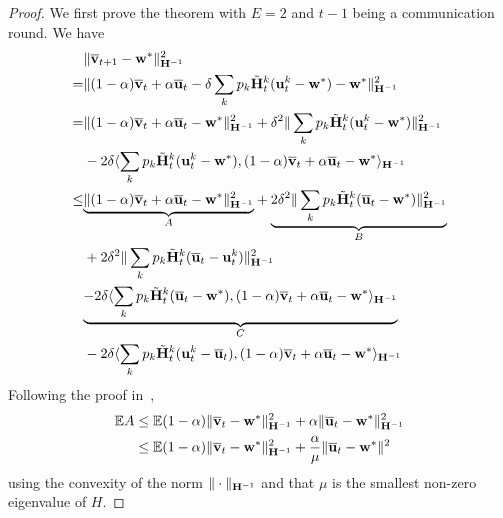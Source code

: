 \begin{proof}
	We first prove the theorem with $E=2$ and $t-1$ being a communication
	round. We have 
	{\small
	\begin{align*}
	& \|\overline{\mathbf{v}}_{t+1}-\mathbf{w}^{\ast}\|_{{\mathbf{H}}^{-1}}^{2}\\
	=&\|(1-\alpha){\overline{\mathbf{v}}}_{t}+\alpha{\overline{\mathbf{u}}}_{t}-\delta\sum_{k}p_{k}\tilde{{\mathbf{H}}}_{t}^{k}({\mathbf{u}}_{t}^{k}-{\mathbf{w}}^{\ast})-{\mathbf{w}}^{\ast}\|_{{\mathbf{H}}^{-1}}^{2}\\
	=&\|(1-\alpha){\overline{\mathbf{v}}}_{t}+\alpha{\overline{\mathbf{u}}}_{t}-{\mathbf{w}}^{\ast}\|_{{\mathbf{H}}^{-1}}^{2}+\delta^{2}\|\sum_{k}p_{k}\tilde{{\mathbf{H}}}_{t}^{k}({\mathbf{u}}_{t}^{k}-{\mathbf{w}}^{\ast})\|_{{\mathbf{H}}^{-1}}^{2}\\
	& -2\delta\langle\sum_{k}p_{k}\tilde{{\mathbf{H}}}_{t}^{k}({\mathbf{u}}_{t}^{k}-{\mathbf{w}}^{\ast}),(1-\alpha){\overline{\mathbf{v}}}_{t}+\alpha{\overline{\mathbf{u}}}_{t}-{\mathbf{w}}^{\ast}\rangle_{{\mathbf{H}}^{-1}}\\
	\leq&\underset{A}{\underbrace{\|(1-\alpha){\overline{\mathbf{v}}}_{t}+\alpha{\overline{\mathbf{u}}}_{t}-{\mathbf{w}}^{\ast}\|_{{\mathbf{H}}^{-1}}^{2}}}+\underset{B}{\underbrace{2\delta^{2}\|\sum_{k}p_{k}\tilde{{\mathbf{H}}}_{t}^{k}({\overline{\mathbf{u}}}_{t}-{\mathbf{w}}^{\ast})\|_{{\mathbf{H}}^{-1}}^{2}}}\\
	&+2\delta^{2}\|\sum_{k}p_{k}\tilde{{\mathbf{H}}}_{t}^{k}({\overline{\mathbf{u}}}_{t}-{\mathbf{u}}_{t}^{k})\|_{{\mathbf{H}}^{-1}}^{2}\\
	& \underset{C}{\underbrace{-2\delta\langle\sum_{k}p_{k}\tilde{{\mathbf{H}}}_{t}^{k}({\overline{\mathbf{u}}}_{t}-{\mathbf{w}}^{\ast}),(1-\alpha){\overline{\mathbf{v}}}_{t}+\alpha{\overline{\mathbf{u}}}_{t}-{\mathbf{w}}^{\ast}\rangle_{{\mathbf{H}}^{-1}}}}\\
	& -2\delta\langle\sum_{k}p_{k}\tilde{{\mathbf{H}}}_{t}^{k}({\mathbf{u}}_{t}^{k}-{\overline{\mathbf{u}}}_{t}),(1-\alpha){\overline{\mathbf{v}}}_{t}+\alpha{\overline{\mathbf{u}}}_{t}-{\mathbf{w}}^{\ast}\rangle_{{\mathbf{H}}^{-1}}
	\end{align*}
	}%
	Following the proof in~\cite{liu2018accelerating}, 
	\begin{align*}
	\mathbb{E}A & \leq\mathbb{E}(1-\alpha)\|{\overline{\mathbf{v}}}_{t}-{\mathbf{w}}^{\ast}\|_{{\mathbf{H}}^{-1}}^{2}+\alpha\|{\overline{\mathbf{u}}}_{t}-{\mathbf{w}}^{\ast}\|_{{\mathbf{H}}^{-1}}^{2}\\
	& \leq\mathbb{E}(1-\alpha)\|{\overline{\mathbf{v}}}_{t}-{\mathbf{w}}^{\ast}\|_{{\mathbf{H}}^{-1}}^{2}+\frac{\alpha}{\mu}\|{\overline{\mathbf{u}}}_{t}-{\mathbf{w}}^{\ast}\|^{2}
	\end{align*}
	using the convexity of the norm $\|\cdot\|_{{\mathbf{H}}^{-1}}$ and that $\mu$
	is the smallest non-zero eigenvalue of $H$. 
	

\end{proof}
